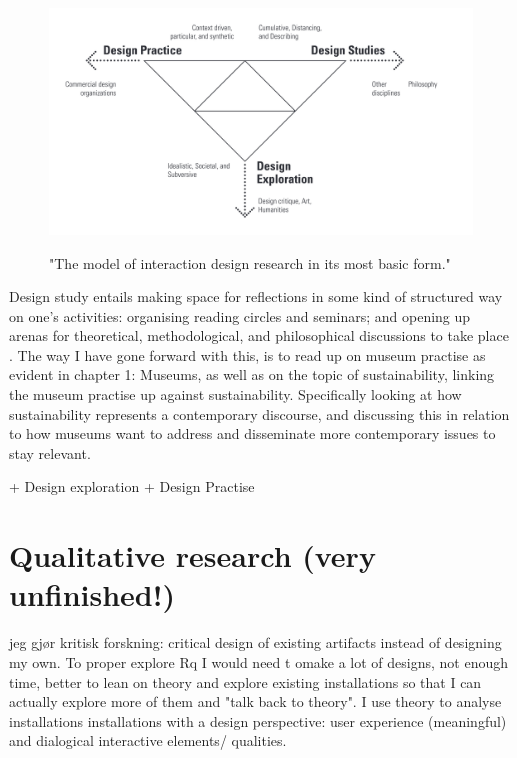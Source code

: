 \begin{figure}[H]
\includegraphics[width=13cm]{pictures/process/triangle.png}
\caption{"The model of interaction design research in its most basic form."}
\autocite[p. 5]{fallman_triangle_2008}
\centering 
\end{figure}



Design study entails making space for reflections in some kind of structured way on one’s activities: organising reading circles and seminars; and opening up arenas for theoretical, methodological, and philosophical discussions to take place \autocite[p. 18]{fallman_triangle_2008}. The way I have gone forward with this, is to read up on museum practise as evident in chapter 1: Museums, as well as on the topic of sustainability, linking the museum practise up against sustainability. Specifically looking at how sustainability represents a contemporary discourse, and discussing this in relation to how museums want to address and disseminate more contemporary issues to stay relevant. 

+ Design exploration
+ Design Practise


\section{Qualitative research (very unfinished!)}
jeg gjør kritisk forskning: critical design of existing artifacts instead of designing my own. To proper explore Rq I would need t omake a lot of designs, not enough time, better to lean on theory and explore existing installations so that I can actually explore more of them and "talk back to theory". I use theory to analyse installations installations with a design perspective: user experience (meaningful) and dialogical interactive elements/ qualities. 

